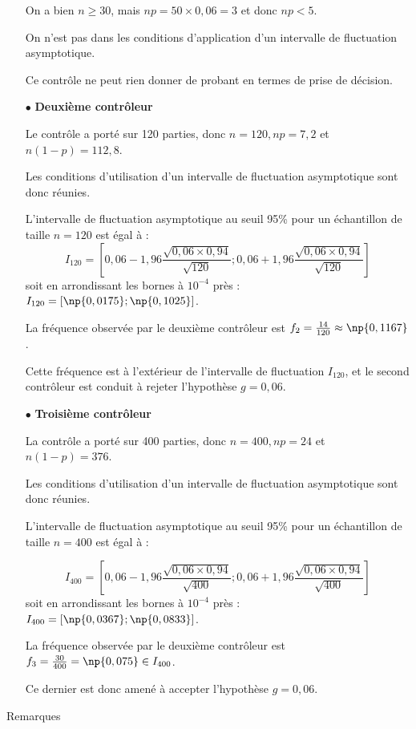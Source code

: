 \begin{spacing}{1.2}
\begin{itemize}
On a bien $n\geq 30$, mais $np=50\times 0,06=3$ et donc $np<5$.

On n'est pas dans les conditions d'application d'un intervalle de fluctuation asymptotique.

Ce contrôle ne peut rien donner de probant en termes de prise de décision.

\item[$\bullet$] \textbf{Deuxième contrôleur}

Le contrôle a porté sur 120 parties, donc $n=120, np=7,2$ et $n(1-p)=112,8$.

Les conditions d'utilisation d'un intervalle de fluctuation asymptotique sont donc réunies.

L'intervalle de fluctuation asymptotique au seuil 95\% pour un échantillon de taille $n=120$ est égal à :
\[I_{120}=\left[0,06-1,96\frac{\sqrt{0,06\times 0,94}}{\sqrt{120}};0,06+1,96\frac{\sqrt{0,06\times 0,94}}{\sqrt{120}}\right]\]
soit en arrondissant les bornes à $10^{-4}$ près : $I_{120}=[\np{0,0175};\np{0,1025}]$.

La fréquence observée par le deuxième contrôleur est $f_2=\frac{14}{120}\approx \np{0,1167}$.

Cette fréquence est à l'extérieur de l'intervalle de fluctuation $I_{120}$, et le second contrôleur est conduit à rejeter l'hypothèse $g=0,06$.

\item[$\bullet$] \textbf{Troisième contrôleur}

La contrôle a porté sur 400 parties, donc $n=400, np=24$ et $n(1-p)=376$.

Les conditions d'utilisation d'un intervalle de fluctuation asymptotique sont donc réunies.

L'intervalle de fluctuation asymptotique au seuil 95\% pour un échantillon de taille $n=400$ est égal à :

\[I_{400}=\left[0,06-1,96\frac{\sqrt{0,06\times 0,94}}{\sqrt{400}};0,06+1,96\frac{\sqrt{0,06\times 0,94}}{\sqrt{400}}\right]\]
soit en arrondissant les bornes à $10^{-4}$ près : $I_{400}=[\np{0,0367};\np{0,0833}]$.

La fréquence observée par le deuxième contrôleur est $f_3=\frac{30}{400}= \np{0,075}\in I_{400}$.

Ce dernier est donc amené à accepter l'hypothèse $g=0,06$.

\end{itemize}

\medskip

\begin{bclogo}[couleur = gray!30 , arrondi = 0.1 ,logo = \bclampe , barre = snake , tailleOndu = 1.5]{Remarques}


\end{bclogo}
\end{spacing}
